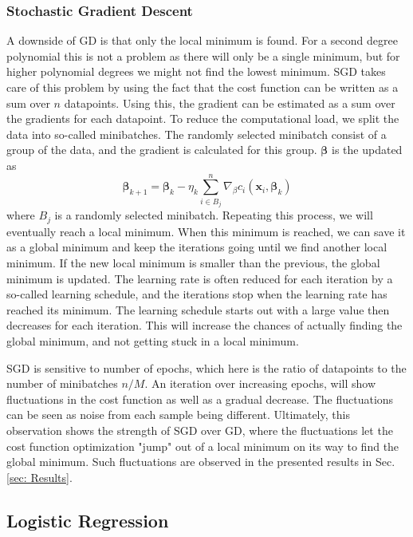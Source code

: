 \documentclass{emulateapj}
\begin{document}
\subsubsection{Stochastic Gradient Descent}
\label{subsubsec: SGD}
A downside of GD is that only the local minimum is found. For a second degree polynomial this is not a problem as there will only be a single minimum, but for higher polynomial degrees we might not find the lowest minimum. SGD takes care of this problem by using the fact that the cost function can be written as a sum over $n$ datapoints. Using this, the gradient can be estimated as a sum over the gradients for each datapoint. To reduce the computational load, we split the data into so-called minibatches. The randomly selected minibatch consist of a group of the data, and the gradient is calculated for this group. $\mathbf{\beta}$ is the updated as
\begin{equation}
    \mathbf{\beta}_{k+1} = \mathbf{\beta}_k - \eta_k \sum_{i\in B_j }^{n}  \nabla_\beta c_i(\mathbf{x}_i, \mathbf{\beta}_k)
\end{equation}
 where $B_j$ is a randomly selected minibatch. Repeating this process, we will eventually reach a local minimum. When this minimum is reached, we can save it as a global minimum and keep the iterations going until we find another local minimum. If the new local minimum is smaller than the previous, the global minimum is updated. The learning rate is often reduced for each iteration by a so-called learning schedule, and the iterations stop when the learning rate has reached its minimum. The learning schedule starts out with a large value then decreases for each iteration. This will increase the chances of actually finding the global minimum, and not getting stuck in a local minimum.
 
 SGD is sensitive to number of epochs, which here is the ratio of datapoints  to the number of minibatches $n/M$. An iteration over increasing epochs, will show fluctuations in the cost function as well as a gradual decrease. The fluctuations can be seen as noise from each sample being different. Ultimately, this observation shows the strength of SGD over GD, where the fluctuations let the cost function optimization "jump" out of a local minimum on its way to find the global minimum. Such fluctuations are observed in the presented results in Sec.\ref{sec: Results}.

\subsection{Logistic Regression}\label{subsec: logistic regression}
\end{document}
